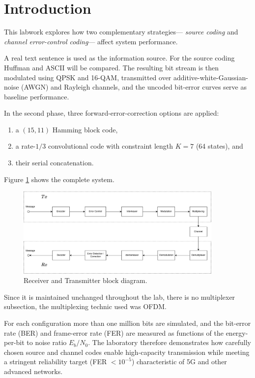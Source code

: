 \section{Introduction}

This labwork explores how two complementary strategies—
\emph{source coding} and \emph{channel error-control coding}—
affect system performance.

A real text sentence is used as the information source.
For the source coding Huffman and ASCII will be compared.
The resulting bit stream is then modulated using QPSK and 16-QAM,
transmitted over additive-white-Gaussian-noise (AWGN) and Rayleigh channels,
and the uncoded bit-error curves serve as baseline performance.

In the second phase, three forward-error-correction options are applied:  
\begin{enumerate}
  \item a $(15,11)$ Hamming block code,
  \item a rate-$1/3$ convolutional code with constraint length $K=7$ (64 states), and
  \item their serial concatenation.
\end{enumerate}

 Figure \ref{fig:RxTx} shows the complete system.

\begin{figure}[H]
  \centering
  \includegraphics[width=0.9\textwidth]{Images/BlockDiagram.png}
  \caption{Receiver and Transmitter block diagram.}
  \label{fig:RxTx}
\end{figure}

Since it is maintained unchanged throughout the lab, there is no multiplexer subsection, the multiplexing technic used was OFDM.  

For each configuration more than one million bits are simulated, and the
bit-error rate (BER) and frame-error rate (FER) are measured as functions
of the energy-per-bit to noise ratio $E_b/N_0$.  
The laboratory therefore demonstrates how carefully chosen source and
channel codes enable high-capacity transmission while meeting a stringent
reliability target (FER $<10^{-5}$) characteristic of 5G and other
advanced networks.

\newpage
